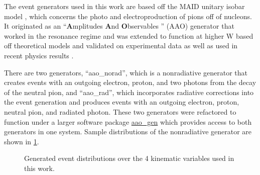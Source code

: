 The event generators used in this work are based off the MAID unitary isobar model \parencite{Tiator2006MAIDTechniques}, \parencite{Dreschsel1992ThresholdNucleons} which concerns the photo and electroproduction of pions off of nucleons. It originated as an ``\textbf{A}mplitudes \textbf{A}nd \textbf{O}bservables '' (AAO) generator that worked in the resonance regime \parencite{Burkert1991AmplitudesGenerator} and was extended to function at higher W based off theoretical models \parencite{Goloskokov2010AnElectroproduction} and validated on experimental data \parencite{Bedlinskiy2014ExclusiveCLAS} as well as used in recent physics results \parencite{Diehl2022MultidimensionalRegion}. 

There are two generators, ``aao\_norad'', which is a nonradiative generator that creates events with an outgoing electron, proton, and two photons from the decay of the neutral pion, and ``aao\_rad'', which incorporates radiative corrections into the event generation and produces events with an outgoing electron, proton, neutral pion, and radiated photon. These two generators were refactored to function under a larger software package \href{https://github.com/JeffersonLab/aao_gen}{aao\_gen} which provides access to both generators in one system. Sample distributions of the nonradiative generator are shown in \ref{fig:aao_norad_gen}.

    \begin{figure}[H]
        \centering
        \hfill
        \caption[Generated Event Distributions]{Generated event distributions over the 4 kinematic variables used in this work.}\label{fig:aao_norad_gen}
    \end{figure}


